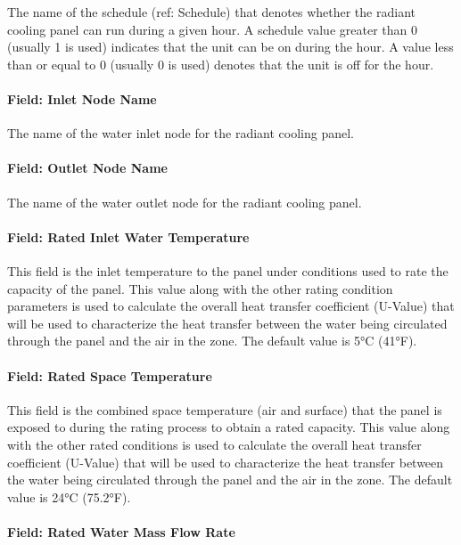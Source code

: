 The name of the schedule (ref: Schedule) that denotes whether the radiant cooling panel can run during a given hour. A schedule value greater than 0 (usually 1 is used) indicates that the unit can be on during the hour. A value less than or equal to 0 (usually 0 is used) denotes that the unit is off for the hour.

\paragraph{Field: Inlet Node Name}\label{field-inlet-node-name-2-002-1}

The name of the water inlet node for the radiant cooling panel.

\paragraph{Field: Outlet Node Name}\label{field-outlet-node-name-2-002-1}

The name of the water outlet node for the radiant cooling panel.

\paragraph{Field: Rated Inlet Water Temperature}

This field is the inlet temperature to the panel under conditions used to rate the capacity of the panel.  This value along with the other rating condition parameters is used to calculate the overall heat transfer coefficient (U-Value) that will be used to characterize the heat transfer between the water being circulated through the panel and the air in the zone.  The default value is 5°C (41°F).

\paragraph{Field: Rated Space Temperature}\label{field-rated-space-temperature}

This field is the combined space temperature (air and surface) that the panel is exposed to during the rating process to obtain a rated capacity.  This value along with the other rated conditions is used to calculate the overall heat transfer coefficient (U-Value) that will be used to characterize the heat transfer between the water being circulated through the panel and the air in the zone.  The default value is 24°C (75.2°F).

\paragraph{Field: Rated Water Mass Flow Rate}\label{field-rated-water-mass-flow-rate}

